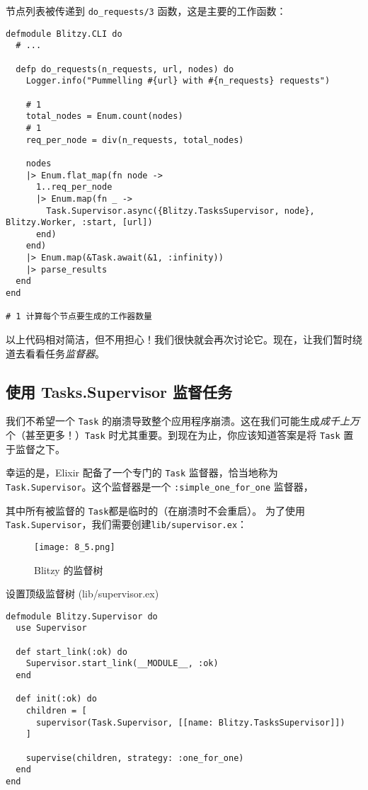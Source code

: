 节点列表被传递到 \texttt{do\_requests/3}
函数，这是主要的工作函数：

\begin{code}{}
\begin{verbatim}
defmodule Blitzy.CLI do
  # ...

  defp do_requests(n_requests, url, nodes) do
    Logger.info("Pummelling #{url} with #{n_requests} requests")

    # 1
    total_nodes = Enum.count(nodes)
    # 1
    req_per_node = div(n_requests, total_nodes)

    nodes
    |> Enum.flat_map(fn node ->
      1..req_per_node
      |> Enum.map(fn _ ->
        Task.Supervisor.async({Blitzy.TasksSupervisor, node}, Blitzy.Worker, :start, [url])
      end)
    end)
    |> Enum.map(&Task.await(&1, :infinity))
    |> parse_results
  end
end

# 1 计算每个节点要生成的工作器数量
\end{verbatim}
\end{code}

以上代码相对简洁，但不用担心！我们很快就会再次讨论它。现在，让我们暂时绕道去看看任务\emph{监督器}。

\subsection{使用 Tasks.Supervisor 监督任务}

我们不希望一个 \texttt{Task}
的崩溃导致整个应用程序崩溃。这在我们可能生成\emph{成千上万}个（甚至更多！）\texttt{Task}
时尤其重要。到现在为止，你应该知道答案是将
\texttt{Task} 置于监督之下。

幸运的是，Elixir 配备了一个专门的 \texttt{Task}
监督器，恰当地称为
\texttt{Task.Supervisor}。这个监督器是一个
\texttt{:simple\_one\_for\_one} 监督器，

其中所有被监督的 \texttt{Task}都是临时的（在崩溃时不会重启）。
为了使用\texttt{Task.Supervisor}，我们需要创建\texttt{lib/supervisor.ex}：

\begin{figure}[!ht]
    \centering
    \texttt{[image: 8\_5.png]}
    \caption{Blitzy 的监督树}
    \label{fig:8_5}
\end{figure}

 

\begin{code}{设置顶级监督树 (lib/supervisor.ex)}

\begin{verbatim}
defmodule Blitzy.Supervisor do
  use Supervisor

  def start_link(:ok) do
    Supervisor.start_link(__MODULE__, :ok)
  end

  def init(:ok) do
    children = [
      supervisor(Task.Supervisor, [[name: Blitzy.TasksSupervisor]])
    ]

    supervise(children, strategy: :one_for_one)
  end
end
\end{verbatim}
\end{code}

